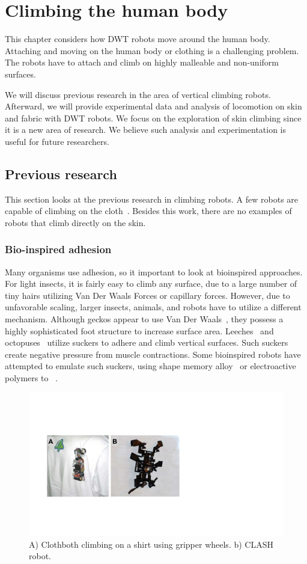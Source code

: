 \chapter{Climbing the human body}
This chapter considers how DWT robots move around the human body. Attaching and moving on the human body or clothing is a challenging problem. The robots have to attach and climb on highly malleable and non-uniform surfaces.

We will discuss previous research in the area of vertical climbing robots. Afterward, we will provide experimental data and analysis of locomotion on skin and fabric with DWT robots. We focus on the exploration of skin climbing since it is a new area of research. We believe such analysis and experimentation is useful for future researchers. 

\section{Previous research}
This section looks at the previous research in climbing robots. A few robots are capable of climbing on the cloth~\cite{birkmeyer2011clash,liu2012system}. Besides this work, there are no examples of robots that climb directly on the skin. 

\subsection{Bio-inspired adhesion}
Many organisms use adhesion, so it important to look at bioinspired approaches. For light insects, it is fairly easy to climb any surface, due to a large number of tiny hairs utilizing Van Der Waals Forces or capillary forces. However, due to unfavorable scaling, larger insects, animals, and robots have to utilize a different mechanism. Although geckos appear to use Van Der Waals~\cite{autumn2002evidence}, they possess a highly sophisticated foot structure to increase surface area. Leeches~\cite{gray1938mechanism} and octopuses~\cite{laschi2009design} utilize suckers to adhere and climb vertical surfaces. Such suckers create negative pressure from muscle contractions. Some bioinspired robots have attempted to emulate such suckers, using shape memory alloy~\cite{bing2009bio} or electroactive polymers to ~\cite{bing2009bio}.

\begin{figure}[!b]
\centering
\includegraphics[width=12.0cm]{pictures/locomotion/cloth_climbing_robots.pdf}
\caption{A) Clothboth climbing on a shirt using gripper wheels. b) CLASH robot.}
\label{fig:cloth_climbing}
\end{figure}

